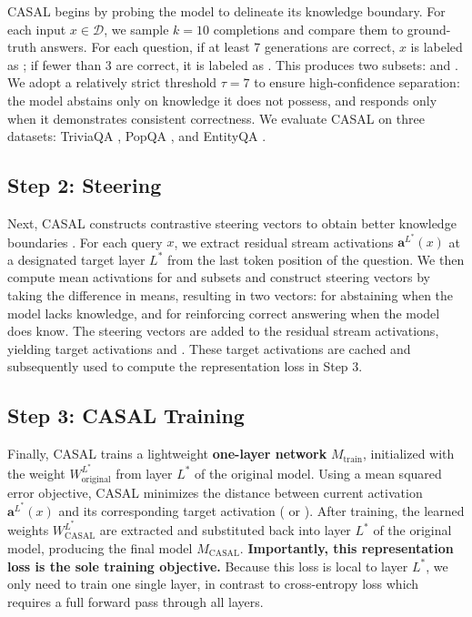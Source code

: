 CASAL begins by probing the model to delineate its knowledge boundary. For each input $x \in \mathcal{D}$, we sample $k=10$ completions and compare them to ground-truth answers. For each question, if at least 7 generations are correct, $x$ is labeled as ; if fewer than 3 are correct, it is labeled as . This produces two subsets:  and . We adopt a relatively strict threshold $\tau=7$ to ensure high-confidence separation: the model abstains only on knowledge it does not possess, and responds only when it demonstrates consistent correctness. We evaluate CASAL on three datasets: TriviaQA \citep{joshi2017triviaqa}, PopQA \citep{mallen2023popqa}, and EntityQA \citep{ferrando2025entity}.

\subsection{Step 2: Steering}

Next, CASAL constructs contrastive steering vectors to obtain better knowledge boundaries \citep{contrastive_activation_addition, turner2024steering, arditi2024refusal}. For each query $x$, we extract residual stream activations $\mathbf{a}^{L^{*}}(x)$ at a designated target layer $L^{*}$ from the last token position of the question. We then compute mean activations for  and  subsets and construct steering vectors by taking the difference in means, resulting in two vectors:  for abstaining when the model lacks knowledge, and  for reinforcing correct answering when the model does know. The steering vectors are added to the residual stream activations, yielding target activations  and . These target activations are cached and subsequently used to compute the representation loss in Step 3.

\subsection{Step 3: CASAL Training}

Finally, CASAL trains a lightweight \textbf{one-layer network} $M_\text{train}$, initialized with the weight $W^{L^{*}}_{\text{original}}$ from layer $L^{*}$ of the original model. Using a mean squared error objective, CASAL minimizes the distance between current activation $\mathbf{a}^{L^{*}}(x)$ and its corresponding target activation ( or ). After training, the learned weights $W^{L^*}_{\text{CASAL}}$ are extracted and substituted back into layer $L^*$ of the original model, producing the final model $M_{\text{CASAL}}$. \textbf{Importantly, this representation loss is the sole training objective.} Because this loss is local to layer $L^*$, we only need to train one single layer, in contrast to cross-entropy loss which requires a full forward pass through all layers.

